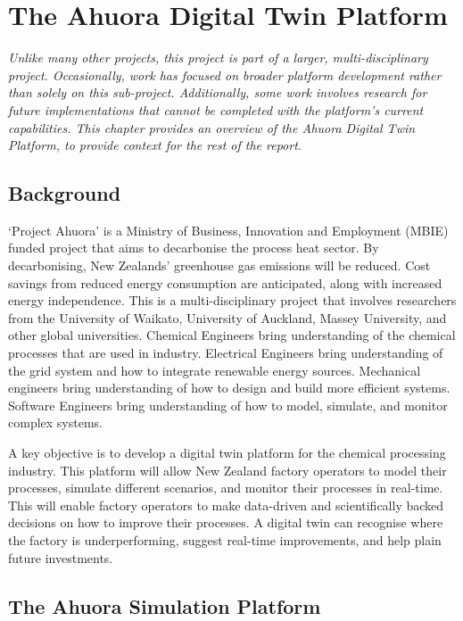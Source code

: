 \chapter{The Ahuora Digital Twin Platform}


\textit{ Unlike many other projects, this project is part of a larger, multi-disciplinary project. Occasionally, work has focused on broader platform development rather than solely on this sub-project. Additionally, some work involves research for future implementations that cannot be completed with the platform's current capabilities. This chapter provides an overview of the Ahuora Digital Twin Platform, to provide context for the rest of the report.}

\section{Background}

`Project Ahuora' is a Ministry of Business, Innovation and Employment (MBIE) funded project that aims to decarbonise the process heat sector.
By decarbonising, New Zealands' greenhouse gas emissions will be reduced. Cost savings from reduced energy consumption are anticipated, along with increased energy independence.
This is a multi-disciplinary project that involves researchers from the University of Waikato, University of Auckland, Massey University,
and other global universities. Chemical Engineers bring understanding of the chemical processes that are used in industry. Electrical Engineers bring understanding of the grid system
and how to integrate renewable energy sources. Mechanical engineers bring understanding of how to design and build more efficient systems. Software Engineers bring understanding of how to
model, simulate, and monitor complex systems.

A key objective is to develop a digital twin platform for the chemical processing industry. This platform will allow New Zealand factory operators to model their processes, simulate different scenarios, and monitor their processes in real-time.
This will enable factory operators to make data-driven and scientifically backed decisions on how to improve their processes. A digital twin can recognise where the factory is underperforming, suggest real-time improvements, and help plain future investments.

\section{The Ahuora Simulation Platform}

